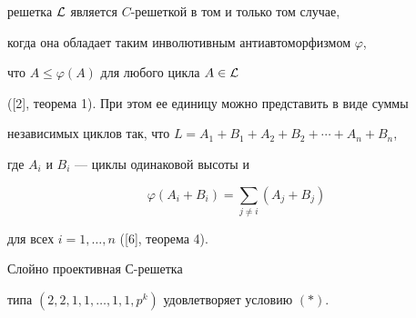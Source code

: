 решетка $\cal L$ является $C$-решеткой в том и только том случае,


когда она обладает таким инволютивным антиавтоморфизмом $\varphi$,


что $A \leq \varphi(A)$ для любого цикла $A \in \cal L$


([2], теорема 1). При этом ее единицу можно представить в виде суммы


независимых циклов так, что $L=A_1+B_1+A_2+B_2+\dotsb+A_n+B_n$,


где $A_i$ и $B_i$ --- циклы одинаковой высоты и


$$


\varphi(A_i+B_i)=\sum_{j \ne i}(A_j+B_j)


$$


для всех $i=1,\dotsc,n$ ([6], теорема 4).





\begin{thm}


Слойно проективная $С$-решетка


типа $(2,2,1,1,\dotsc,1,1,p^k)$ удовлетворяет условию $(\ast)$.


\end{thm}





